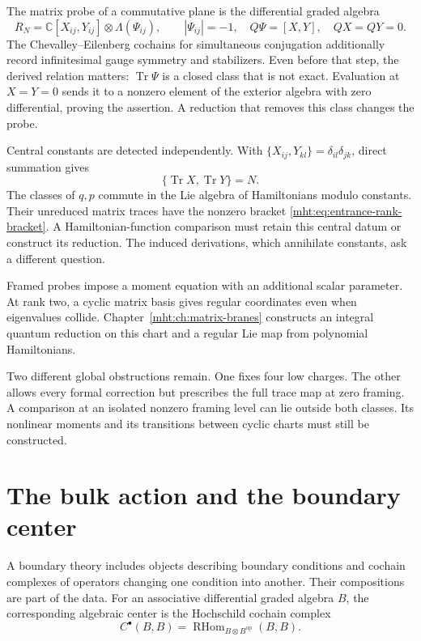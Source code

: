 The matrix probe of a commutative plane is the differential graded
algebra
\begin{equation}\label{mht:eq:entrance-matrix-probe}
 R_N=\mathbb C[X_{ij},Y_{ij}]\otimes\Lambda(\Psi_{ij}),\qquad
 |\Psi_{ij}|=-1,\quad Q\Psi=[X,Y],\quad QX=QY=0.
\end{equation}
The Chevalley--Eilenberg cochains for simultaneous conjugation additionally
record infinitesimal gauge symmetry and stabilizers.
Even before that step, the derived relation matters:
$\operatorname{Tr}\Psi$ is a closed class that is not exact. Evaluation
at $X=Y=0$ sends it to a nonzero element of the exterior algebra
with zero differential, proving the assertion. A reduction that
removes this class changes the probe.

Central constants are detected independently. With
$\{X_{ij},Y_{kl}\}=\delta_{il}\delta_{jk}$, direct summation gives
\begin{equation}\label{mht:eq:entrance-rank-bracket}
 \{\operatorname{Tr}X,\operatorname{Tr}Y\}=N.
\end{equation}
The classes of $q,p$ commute in the Lie algebra of Hamiltonians modulo
constants. Their unreduced matrix traces have the nonzero bracket
\eqref{mht:eq:entrance-rank-bracket}. A Hamiltonian-function comparison
must retain this central datum or construct its reduction. The
induced derivations, which annihilate constants, ask a different
question.

Framed probes impose a moment equation with an additional scalar
parameter. At rank two, a cyclic matrix basis gives regular coordinates
even when eigenvalues collide. Chapter~\ref{mht:ch:matrix-branes}
constructs an integral quantum reduction on this chart and a regular
Lie map from polynomial Hamiltonians.

Two different global obstructions remain. One fixes four low charges. The other allows
every formal correction but prescribes the full trace map at zero
framing. A comparison at an isolated nonzero framing level can
lie outside both classes. Its nonlinear moments and its transitions
between cyclic charts must still be constructed.

\section{The bulk action and the boundary center}

A boundary theory includes objects describing boundary conditions and
cochain complexes of operators changing one condition into another.
Their compositions are part of the data. For an associative
differential graded algebra $B$, the corresponding algebraic center is
the Hochschild cochain complex
\[
 C^\bullet(B,B)=\operatorname{RHom}_{B\otimes B^{\mathrm{op}}}(B,B).
\]


